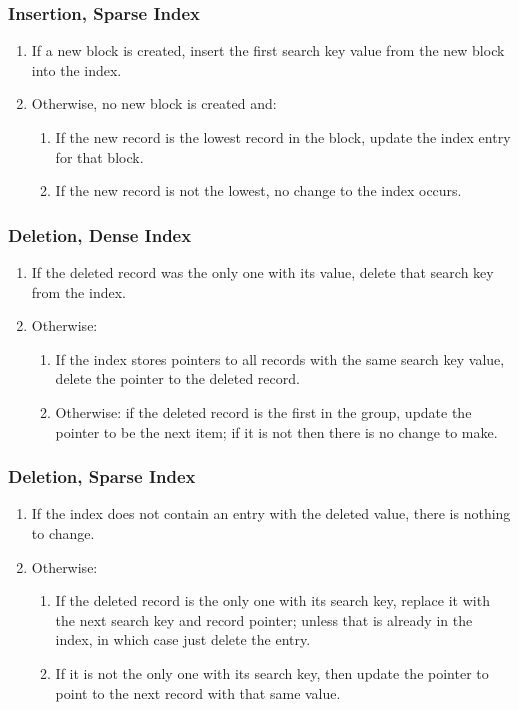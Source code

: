 \begin{frame}
\frametitle{Insertion, Sparse Index}

\begin{enumerate}
	\item If a new block is created, insert the first search key value from the new block into the index.
	\item Otherwise, no new block is created and:
		\begin{enumerate}
			\item If the new record is the lowest record in the block, update the index entry for that block.
			\item If the new record is not the lowest, no change to the index occurs.
		\end{enumerate}
\end{enumerate}

\end{frame}

\begin{frame}
\frametitle{Deletion, Dense Index}


\begin{enumerate}
	\item If the deleted record was the only one with its value, delete that search key from the index.
	\item Otherwise:
		\begin{enumerate}
			\item If the index stores pointers to all records with the same search key value, delete the pointer to the deleted record.
			\item Otherwise: if the deleted record is the first in the group, update the pointer to be the next item; if it is not then there is no change to make.
		\end{enumerate}
\end{enumerate}

\end{frame}


\begin{frame}
\frametitle{Deletion, Sparse Index}

\begin{enumerate}
	\item If the index does not contain an entry with the deleted value, there is nothing to change.
	\item Otherwise:
		\begin{enumerate}
			\item If the deleted record is the only one with its search key, replace it with the next search key and record pointer; unless that is already in the index, in which case just delete the entry.
			\item If it is not the only one with its search key, then update the pointer to point to the next record with that same value.
		\end{enumerate}
\end{enumerate}


\end{frame}

